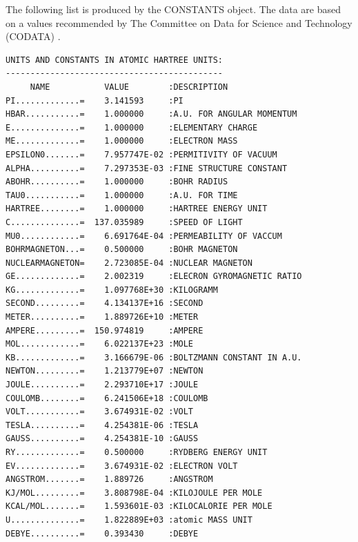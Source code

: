 \documentclass[final,12pt,makeidx,DIV=calc]{article}
\begin{document}
{{{The following list is produced by the CONSTANTS object.  The data are
based on a values recommended by The Committee on Data for Science and
Technology (CODATA) \cite{mohr00_rmp72_351}.
\begin{verbatim}
UNITS AND CONSTANTS IN ATOMIC HARTREE UNITS:
--------------------------------------------
     NAME           VALUE        :DESCRIPTION
PI.............=    3.141593     :PI
HBAR...........=    1.000000     :A.U. FOR ANGULAR MOMENTUM
E..............=    1.000000     :ELEMENTARY CHARGE
ME.............=    1.000000     :ELECTRON MASS
EPSILON0.......=    7.957747E-02 :PERMITIVITY OF VACUUM
ALPHA..........=    7.297353E-03 :FINE STRUCTURE CONSTANT
ABOHR..........=    1.000000     :BOHR RADIUS
TAU0...........=    1.000000     :A.U. FOR TIME
HARTREE........=    1.000000     :HARTREE ENERGY UNIT
C..............=  137.035989     :SPEED OF LIGHT
MU0............=    6.691764E-04 :PERMEABILITY OF VACCUM
BOHRMAGNETON...=    0.500000     :BOHR MAGNETON
NUCLEARMAGNETON=    2.723085E-04 :NUCLEAR MAGNETON
GE.............=    2.002319     :ELECRON GYROMAGNETIC RATIO
KG.............=    1.097768E+30 :KILOGRAMM      
SECOND.........=    4.134137E+16 :SECOND     
METER..........=    1.889726E+10 :METER
AMPERE.........=  150.974819     :AMPERE           
MOL............=    6.022137E+23 :MOLE
KB.............=    3.166679E-06 :BOLTZMANN CONSTANT IN A.U.
NEWTON.........=    1.213779E+07 :NEWTON
JOULE..........=    2.293710E+17 :JOULE
COULOMB........=    6.241506E+18 :COULOMB
VOLT...........=    3.674931E-02 :VOLT
TESLA..........=    4.254381E-06 :TESLA
GAUSS..........=    4.254381E-10 :GAUSS
RY.............=    0.500000     :RYDBERG ENERGY UNIT
EV.............=    3.674931E-02 :ELECTRON VOLT
ANGSTROM.......=    1.889726     :ANGSTROM
KJ/MOL.........=    3.808798E-04 :KILOJOULE PER MOLE
KCAL/MOL.......=    1.593601E-03 :KILOCALORIE PER MOLE
U..............=    1.822889E+03 :atomic MASS UNIT 
DEBYE..........=    0.393430     :DEBYE



\end{verbatim}}}}
\end{document}
